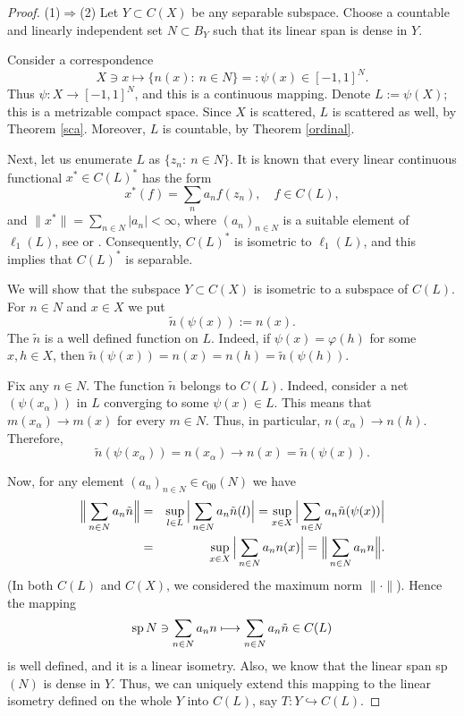 \documentclass[12pt]{amsart}
\theoremstyle{plain}
\theoremstyle{definition}
\theoremstyle{remark}
\def\vv{\varphi}
\begin{document}
\begin{proof}
(1)$\Longrightarrow$(2) Let $Y\subset C(X)$ be any separable subspace. Choose a countable and linearly independent set $N\subset B_Y$ such that its linear span is dense in $Y$.

Consider a correspondence
$$
X\ni x\longmapsto \{n(x):\ n\in N\}=:\psi(x)\in [-1,1]^{N}.
$$
Thus $\psi: X\longrightarrow [-1,1]^{N}$, and this is a continuous mapping. Denote
$L:=\psi(X)$; this is a metrizable compact space.
Since $X$ is scattered,  $L$ is scattered as well, by Theorem \ref{sca}. Moreover, $L$ is countable, by Theorem \ref{ordinal}.

Next, let us enumerate $L$ as $\{z_{n}:\ n\in N\}$.
It is known that every  linear continuous functional $x^*\in C(L)^{*}$ has the form
$$
x^*(f)=\sum_{n}a_n f(z_n),\quad f\in C(L),
$$
and $\|x^*\|=\sum_{n\in N} |a_n| < \infty$,
where $(a_n)_{n\in N}$ is a suitable element of $\ell_1(L)$, see \cite[Main Theorem (11)]{Pelczynski-Semadeni} or \cite[Corollary 19.7.7]{Semadeni}.
Consequently, $C(L)^{*}$ is isometric to $\ell_1(L)$, and this implies that $C(L)^*$ is separable.

We will show that the subspace $Y\subset C(X)$ is isometric to a subspace of $C(L)$.  %
For $n\in N$ and $x\in X$ we put
$$
\tilde n(\psi(x)):= n(x).
$$
The $\tilde n$ is a well defined function on $L$. Indeed, if $\psi(x)=\vv(h)$ for some $x, h\in X$, then  $\tilde n(\psi(x))= n(x)=n(h)=\tilde n(\psi(h))$.

Fix any $n\in N$. The function $\tilde n$ belongs to $C(L)$. Indeed, consider a net $(\psi(x_\alpha))$ in $L$ converging to some $\psi(x)\in L$.
This means that $m(x_\alpha)\to m(x)$ for every $m\in N$. Thus, in particular, $n(x_\alpha)\to n(h)$. Therefore, $$\tilde n(\psi(x_\alpha))=n(x_\alpha)\longrightarrow n(x)= \tilde n(\psi(x)).$$

Now, for any element $(a_n)_{n\in N} \in c_{00}(N)$ we have
\begin{eqnarray*}
\Big\|\sum_{n\in N} a_n \tilde n\Big\|&=& \sup_{l\in L}\Big|\sum_{n\in N} a_n\tilde n (l)\Big| =
\sup_{x\in X}\Big|\sum_{n\in N} a_n\tilde n (\psi(x))\Big| \cr
&=& \sup_{x\in X}\Big|\sum_{n\in N} a_nn(x)\Big|= \Big\|\sum_{n\in N}a_nn\Big\|.
\end{eqnarray*}
(In both $C(L)$ and $C(X)$, we considered the maximum norm $\|\cdot\|$).
Hence the mapping
$$
{\rm sp}\, N\ni \sum_{n\in N}a_nn\longmapsto \sum_{n\in N} a_n\tilde n \in C(L)
$$
is well defined, and it is a linear isometry.  Also, we know that the linear span sp$(N)$ is dense in $Y$. Thus, we can uniquely extend this mapping to the
linear isometry defined on the whole $Y$ into $C(L)$, say $T: Y\hookrightarrow C(L)$. %


\end{proof}
\end{document}
